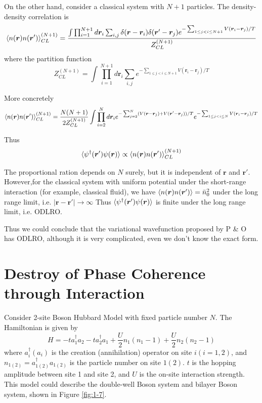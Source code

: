 On the other hand, consider a classical system with $N+1$ particles. The density-density correlation is 
\begin{equation}
\braket{n(\bm r)n(\bm r')}^{(N+1)}_{CL} = \frac{\int \prod_{i=1}^{N+1} d\bm r_i\sum_{i,j} \delta(\bm r-\bm r_i)\delta(\bm r'-\bm r_j) e^{-\sum_{1\leq j<i\leq N+1}V(\bm r_i-\bm r_j)/T}}{Z^{(N+1)}_{CL}}
\end{equation}
where the partition function
\begin{equation}
Z^{(N+1)}_{CL} = \int \prod_{i=1}^{N+1} d\bm r_i \sum_{i,j} e^{-\sum_{1\leq j<i\leq N+1}V(\bm r_i-\bm r_j)/T}
\end{equation}

More concretely
\begin{equation}
\braket{n(\bm r)n(\bm r')}^{(N+1)}_{CL} = \frac{N(N+1)}{2Z^{(N+1)}_{CL}} \int \prod_{i=2}^N d\bm r_i e^{-\sum_{j=2}^N (V(\bm r-\bm r_j)+V(\bm r'-\bm r_j))/T} e^{-\sum_{1\leq j<i\leq N} V(\bm r_i-\bm r_j)/T} 
\end{equation}

Thus 
\begin{equation}
\braket{\psi^\dag(\bm r')\psi(\bm r)} \propto \braket{n(\bm r)n(\bm r')}^{(N+1)}_{CL}
\end{equation}

The proportional ration depends on $N$ surely, but it is independent of $\bm r$ and $\bm r'$.
However,for the classical system with uniform potential under the short-range interaction (for example, classical fluid), we have $\braket{n(\bm r)n(\bm r')} = \bar n_0^2$ under the long range limit, i.e. $|\bm r-\bm r'| \rightarrow \infty$
Thus $\braket{\psi^\dag(\bm r')\psi(\bm r)}$ is finite under the long range limit, i.e. ODLRO. 

Thus we could conclude that the variational wavefunction proposed by P \& O has ODLRO, although it is very complicated, even we don't know the exact form. 


\section{Destroy of Phase Coherence through Interaction}

Consider 2-site Boson Hubbard Model with fixed particle number $N$.
The Hamiltonian is given by
\begin{equation}
H = -t a_1^\dag a_2 -t a_2^\dag a_1 +\frac{U}{2} n_1(n_1-1) +\frac{U}{2} n_2(n_2-1)
\end{equation}
where $a_{i}^\dag (a_{i})$ is the creation (annihilation) operator on site $i (i=1, 2)$, and $n_{1(2)} = a^\dag_{1(2)}a_{1(2)}$ is the particle number on site $1(2)$. $t$ is the hopping amplitude between site 1 and site 2, and $U$ is the on-site interaction strength.
This model could describe the double-well Boson system and bilayer Boson system, shown in Figure \ref{fig:1-7}. 


